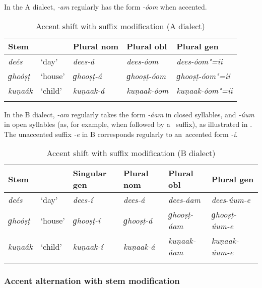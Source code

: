 In the A dialect, \textit{-am} regularly has the form \textit{-óom} when accented.

\begin{table}[p]
\caption{Accent shift with suffix modification (A dialect)}
\begin{tabularx}{\textwidth}{ l@{\hspace{20pt}} l@{\hspace{20pt}} Q Q Q }
\lsptoprule
Stem &
&
Plural nom &
Plural obl &
Plural gen \\\midrule
\textit{deés} &
`day' &
\textit{dees-á} &
\textit{dees-óom} &
\textit{dees-óom"=ii} \\
\textit{ɡhoóṣṭ} &
`house' &
\textit{ɡhooṣṭ-á} &
\textit{ɡhooṣṭ-óom} &
\textit{ɡhooṣṭ-óom"=ii} \\
\textit{kuṇaák} &
`child' &
\textit{kuṇaak-á} &
\textit{kuṇaak-óom} &
\textit{kuṇaak-óom"=ii} \\\lspbottomrule
\end{tabularx}
\label{tab:3-11}
\end{table}


In the B dialect, \textit{\--am} regularly takes the form \textit{-áam} in closed syllables, and \textit{-úum} in open syllables (as, for example, when followed by a~ suffix), as illustrated in . The unaccented  suffix \textit{-e} in B corresponds regularly to an~accented form \textit{-í}.



\begin{table}[p]
\caption{Accent shift with suffix modification (B dialect)}
\begin{tabularx}{\textwidth}{ Q l l l l l }
\lsptoprule
Stem &
&
Singular gen &
Plural nom &
Plural obl &
Plural gen \\\midrule
\textit{deés} &
`day' &
\textit{dees-í} &
\textit{dees-á} &
\textit{dees-áam} &
\textit{dees}-\textit{úum-e}\\
\textit{ɡhoóṣṭ} &
`house' &
\textit{ɡhooṣṭ-í} &
\textit{ɡhooṣṭ-á} &
\textit{ɡhooṣṭ-áam} &
\textit{ɡhooṣṭ-úum-e} \\
\textit{kuṇaák} &
`child' &
\textit{kuṇaak-í} &
\textit{kuṇaak-á} &
\textit{kuṇaak-áam} &
\textit{kuṇaak-úum-e} \\\lspbottomrule
\end{tabularx}
\label{tab:3-12}
\end{table}

\subsubsection*{Accent alternation with stem modification}

